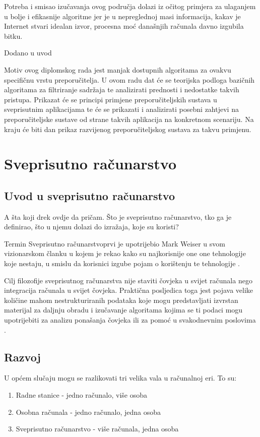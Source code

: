 \documentclass[times, utf8, diplomski, numeric]{fer}
\begin{document}
Potreba i smisao izučavanja ovog područja dolazi iz očitog primjera za
ulaganjem u bolje i efikasnije algoritme jer je u nepreglednoj masi
informacija, kakav je Internet stvari idealan izvor, procesna moć današnjih
računala davno izgubila bitku.

Dodano u uvod

Motiv ovog diplomskog rada jest manjak dostupnih algoritama za ovakvu
specifičnu vrstu preporučitelja. U ovom radu dat će se teorijska
podloga bazičnih algoritama za filtriranje sadržaja te analizirati prednosti i
nedostatke takvih pristupa. Prikazat će se principi primjene preporučiteljskih
sustava u sveprisutnim aplikacijama te će se prikazati i analizirati posebni
zahtjevi na preporučiteljske sustave od strane takvih aplikacija na konkretnom
scenariju. Na kraju će biti dan prikaz razvijenog preporučiteljskog sustava za
takvu primjenu.

\chapter{Sveprisutno računarstvo}
\section{Uvod u sveprisutno računarstvo}
A šta koji drek ovdje da pričam. Što je sveprisutno računarstvo, tko ga je
definirao, što u njemu dolazi do izražaja, koje su koristi?

Termin \glqq Sveprisutno računarstvo\grqq prvi je upotrijebio Mark Weiser u
svom vizionarskom članku u kojem je rekao kako su najkorisnije
one one tehnologije koje nestaju, u smislu da korisnici izgube pojam o
korištenju te tehnologije \cite{computer21}. 

Cilj filozofije sveprisutnog računarstva nije staviti čovjeka u svijet računala
nego integracija računala u svijet čovjeka. Praktična posljedica toga jest
pojava velike količine mahom nestrukturiranih podataka koje mogu predstavljati
izvrstan materijal za daljnju obradu i izučavanje algoritama kojima se ti podaci
mogu upotrijebiti za analizu ponašanja čovjeka ili za pomoć u svakodnevnim
poslovima \cite{VukoticTankovic}.



\section{Razvoj}
U općem slučaju mogu se razlikovati tri velika vala u računalnoj eri. To su:
\begin{enumerate}
  \item Radne stanice  - jedno računalo, više osoba
  \item Osobna računala  - jedno računalo, jedna
  osoba
  \item Sveprisutno računarstvo  - više računala,
  jedna osoba
\end{enumerate}
\end{document}

